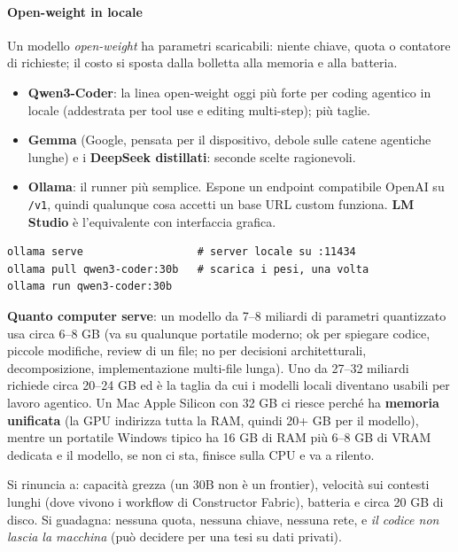 \documentclass[a4paper,12pt]{article}
\begin{document}
\paragraph{Open-weight in locale} Un modello \emph{open-weight} ha parametri scaricabili:
niente chiave, quota o contatore di richieste; il costo si sposta dalla bolletta alla
memoria e alla batteria.
\begin{itemize}
  \item \textbf{Qwen3-Coder}: la linea open-weight oggi più forte per coding agentico in
        locale (addestrata per tool use e editing multi-step); più taglie.
  \item \textbf{Gemma} (Google, pensata per il dispositivo, debole sulle catene agentiche
        lunghe) e i \textbf{DeepSeek distillati}: seconde scelte ragionevoli.
  \item \textbf{Ollama}: il runner più semplice. Espone un endpoint compatibile OpenAI su
        \texttt{/v1}, quindi qualunque cosa accetti un base URL custom funziona. \textbf{LM
        Studio} è l'equivalente con interfaccia grafica.
\end{itemize}
\begin{verbatim}
ollama serve                  # server locale su :11434
ollama pull qwen3-coder:30b   # scarica i pesi, una volta
ollama run qwen3-coder:30b
\end{verbatim}
\textbf{Quanto computer serve}: un modello da 7--8 miliardi di parametri quantizzato usa
circa 6--8 GB (va su qualunque portatile moderno; ok per spiegare codice, piccole modifiche,
review di un file; no per decisioni architetturali, decomposizione, implementazione
multi-file lunga). Uno da 27--32 miliardi richiede circa 20--24 GB ed è la taglia da cui i
modelli locali diventano usabili per lavoro agentico. Un Mac Apple Silicon con 32 GB ci
riesce perché ha \textbf{memoria unificata} (la GPU indirizza tutta la RAM, quindi 20+ GB
per il modello), mentre un portatile Windows tipico ha 16 GB di RAM più 6--8 GB di VRAM
dedicata e il modello, se non ci sta, finisce sulla CPU e va a rilento.

Si rinuncia a: capacità grezza (un 30B non è un frontier), velocità sui contesti lunghi
(dove vivono i workflow di Constructor Fabric), batteria e circa 20 GB di disco. Si
guadagna: nessuna quota, nessuna chiave, nessuna rete, e \emph{il codice non lascia la
macchina} (può decidere per una tesi su dati privati).
\end{document}
